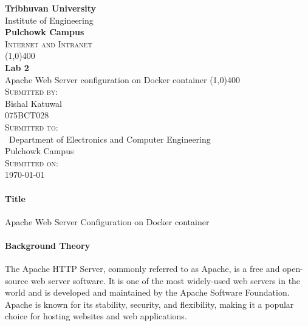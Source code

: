 \documentclass[12pt]{article}
\begin{document}
\begin{titlepage}
    \begin{center}
        \huge{\bfseries  Tribhuvan University}\\
        \Large{Institute of Engineering}\\
        \huge{ \bfseries  Pulchowk Campus}\\[3.2cm]


        \textsc{\Large Internet and Intranet}\\[-0.5cm]
        \line(1,0){400}\\
        \huge{\bfseries Lab 2}\\
        \large{Apache Web Server configuration on Docker
        container}
        \line(1,0){400}\\


        \textsc{\Large Submitted by:}\\
        \Large Bishal Katuwal\\ \large 075BCT028\\    [0.85cm]

        \textsc{\Large Submitted to:}\\\
        \large Department of Electronics and Computer Engineering\\Pulchowk Campus\\    [0.85cm]
        
        \textsc{\Large Submitted on:}\\
        \today
        
    \end{center}
\end{titlepage}
\pagebreak
\paragraph{\Large Title\\}
Apache Web Server
Configuration on Docker
container

\paragraph{Background Theory\\}
The Apache HTTP Server, commonly referred to as Apache, is a free and open-source web server software. It is one of the most widely-used web servers in the world and is developed and maintained by the Apache Software Foundation. Apache is known for its stability, security, and flexibility, making it a popular choice for hosting websites and web applications.
\end{document}
